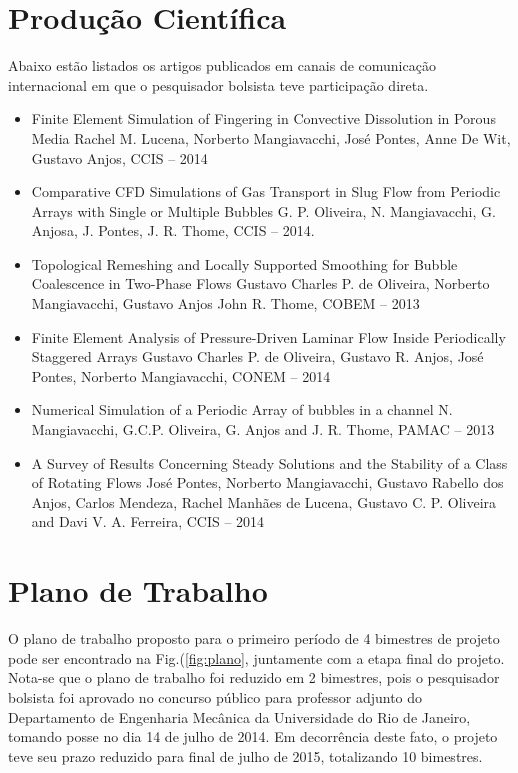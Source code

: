 \documentclass[a4paper,portuges,12pt]{article}
\begin{document}
\section{Produção Científica}
Abaixo estão listados os artigos publicados em canais de comunicação
internacional em que o pesquisador bolsista teve participação direta.

\begin{itemize}
	\item Finite Element Simulation of Fingering in Convective Dissolution in
	      Porous Media Rachel M. Lucena, Norberto Mangiavacchi, José Pontes,
	      Anne De Wit, Gustavo Anjos, CCIS -- 2014
	\item Comparative CFD Simulations of Gas Transport in Slug Flow from
		  Periodic Arrays with Single or Multiple Bubbles G. P.
		  Oliveira, N. Mangiavacchi, G. Anjosa, J. Pontes, J. R. Thome,
		  CCIS -- 2014.
	\item Topological Remeshing and Locally Supported Smoothing for
	      Bubble Coalescence in Two-Phase Flows
		  Gustavo Charles P. de Oliveira, Norberto Mangiavacchi, Gustavo Anjos
		  John R. Thome, COBEM -- 2013
	\item Finite Element Analysis of Pressure-Driven Laminar Flow Inside
	      Periodically Staggered Arrays
		  Gustavo Charles P. de Oliveira, Gustavo R. Anjos, José Pontes,
		  Norberto Mangiavacchi, CONEM -- 2014
	\item Numerical Simulation of a Periodic Array of bubbles in a
	      channel
	      N. Mangiavacchi, G.C.P. Oliveira, G. Anjos and J. R. Thome,
		  PAMAC -- 2013
	\item A Survey of Results Concerning Steady Solutions and the
	      Stability of a Class of Rotating Flows
		  José Pontes, Norberto Mangiavacchi, Gustavo Rabello dos Anjos,
		  Carlos Mendeza, Rachel Manhães de Lucena, Gustavo C. P.
		  Oliveira and Davi V. A. Ferreira, CCIS -- 2014
\end{itemize}

\section{Plano de Trabalho}
O plano de trabalho proposto para o primeiro período de 4 bimestres de
projeto pode ser encontrado na Fig.(\ref{fig:plano}, juntamente com a
etapa final do projeto. Nota-se que o plano de trabalho foi reduzido em
2 bimestres, pois o pesquisador bolsista foi aprovado no concurso
público para professor adjunto do Departamento de Engenharia Mecânica da
Universidade do Rio de Janeiro, tomando posse no dia 14 de julho de
2014. Em decorrência deste fato, o projeto teve seu prazo reduzido para
final de julho de 2015, totalizando 10 bimestres. 
\end{document}
